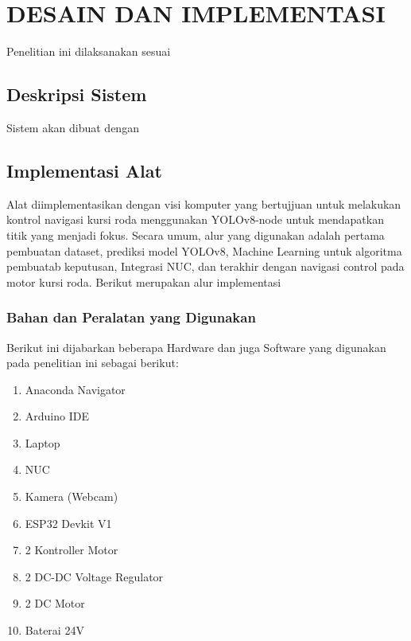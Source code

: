 \chapter{DESAIN DAN IMPLEMENTASI}
\label{chap:desainimplementasi}


Penelitian ini dilaksanakan sesuai \lipsum[1][1-5]

\section{Deskripsi Sistem}
\label{sec:deskripsisistem}

Sistem akan dibuat dengan \lipsum[1-2]

\section{Implementasi Alat
  \label{sec:implementasi alat}}

Alat diimplementasikan dengan visi komputer yang bertujjuan untuk melakukan kontrol navigasi kursi roda menggunakan YOLOv8-node untuk mendapatkan titik yang menjadi fokus. Secara umum, alur yang digunakan adalah pertama pembuatan dataset, prediksi model YOLOv8, Machine Learning untuk algoritma pembuatab keputusan, Integrasi NUC, dan terakhir dengan navigasi control pada motor kursi roda. Berikut merupakan alur implementasi

\subsection{Bahan dan Peralatan yang Digunakan}
\label{subsec:bahandanperalatan}
Berikut ini dijabarkan beberapa Hardware dan juga Software yang digunakan pada penelitian ini sebagai berikut:

\renewcommand{\labelenumi}{\arabic{enumi}.}
\begin{enumerate}
  \item Anaconda Navigator
  \item Arduino IDE
  \item Laptop
  \item NUC
  \item Kamera (Webcam)
  \item ESP32 Devkit V1
  \item 2 Kontroller Motor
  \item 2 DC-DC Voltage Regulator
  \item 2 DC Motor
  \item Baterai 24V
\end{enumerate}

